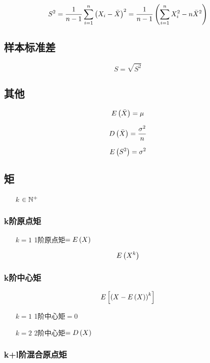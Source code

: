 \documentclass{article}
\begin{document}
\[S^2=\frac1{n-1}\sum_{i=1}^n{\left(X_i-\bar X\right)}^2=\frac1{n-1}\left(\sum_{i=1}^n X_i^2-n\bar X^2\right)\]

\subsection{样本标准差}

\[S=\sqrt{S^2}\]

\subsection{其他}

\[E\left(\bar X\right)=\mu\]

\[D\left(\bar X\right)=\frac{\sigma^2}n\]

\[E\left(S^2\right)=\sigma^2\]

\subsection{矩}

\begin{enumerate}
    \item [$k$] $\in\mathbb N^+$
\end{enumerate}

\subsubsection{k阶原点矩}

\begin{enumerate}
    \item [$k=1$] 1阶原点矩$=E\left(X\right)$
\end{enumerate}

\[E\left(X^k\right)\]

\subsubsection{k阶中心矩}

\[E\left[{\left(X-E\left(X\right)\right)}^k\right]\]

\begin{enumerate}
    \item [$k=1$] 1阶中心矩$=0$
    \item [$k=2$] 2阶中心矩$=D\left(X\right)$
\end{enumerate}

\subsubsection{k+l阶混合原点矩}
\end{document}
